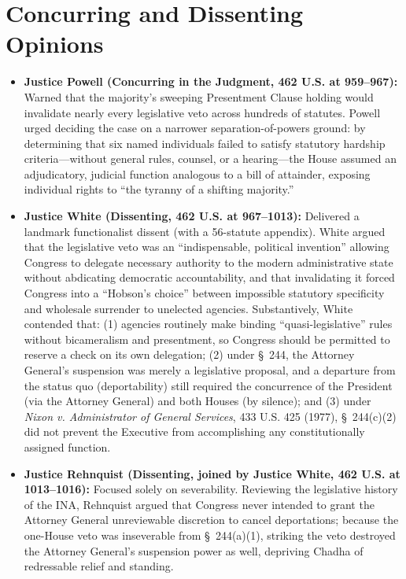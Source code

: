 \documentclass[12pt]{article}
\begin{document}
\section{Concurring and Dissenting Opinions}
\begin{itemize}
  \item \textbf{Justice Powell (Concurring in the Judgment, 462 U.S. at 959--967):} Warned that the majority's sweeping Presentment Clause holding would invalidate nearly every legislative veto across hundreds of statutes. Powell urged deciding the case on a narrower separation-of-powers ground: by determining that six named individuals failed to satisfy statutory hardship criteria---without general rules, counsel, or a hearing---the House assumed an adjudicatory, judicial function analogous to a bill of attainder, exposing individual rights to ``the tyranny of a shifting majority.''
  \item \textbf{Justice White (Dissenting, 462 U.S. at 967--1013):} Delivered a landmark functionalist dissent (with a 56-statute appendix). White argued that the legislative veto was an ``indispensable, political invention'' allowing Congress to delegate necessary authority to the modern administrative state without abdicating democratic accountability, and that invalidating it forced Congress into a ``Hobson's choice'' between impossible statutory specificity and wholesale surrender to unelected agencies. Substantively, White contended that: (1) agencies routinely make binding ``quasi-legislative'' rules without bicameralism and presentment, so Congress should be permitted to reserve a check on its own delegation; (2) under \S~244, the Attorney General's suspension was merely a legislative proposal, and a departure from the status quo (deportability) still required the concurrence of the President (via the Attorney General) and both Houses (by silence); and (3) under \textit{Nixon v. Administrator of General Services}, 433 U.S. 425 (1977), \S~244(c)(2) did not prevent the Executive from accomplishing any constitutionally assigned function.
  \item \textbf{Justice Rehnquist (Dissenting, joined by Justice White, 462 U.S. at 1013--1016):} Focused solely on severability. Reviewing the legislative history of the INA, Rehnquist argued that Congress never intended to grant the Attorney General unreviewable discretion to cancel deportations; because the one-House veto was inseverable from \S~244(a)(1), striking the veto destroyed the Attorney General's suspension power as well, depriving Chadha of redressable relief and standing.
\end{itemize}
\end{document}
